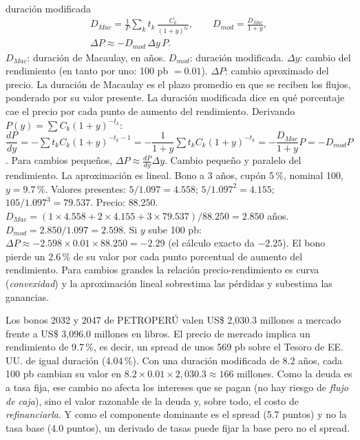 \begin{ficha}{duración modificada}
\begin{gather*} D_{Mac}=\frac{1}{P}\sum_{k}t_k\,\frac{C_k}{(1+y)^{t_k}},\qquad D_{mod}=\frac{D_{Mac}}{1+y},\\ \Delta P\approx-D_{mod}\,\Delta y\,P. \end{gather*}
 $D_{Mac}$: duración de Macaulay, en años. $D_{mod}$: duración modificada. $\Delta y$: cambio del rendimiento (en tanto por uno: 100 pb $=0.01$). $\Delta P$: cambio aproximado del precio.
 La duración de Macaulay es el plazo promedio en que se reciben los flujos, ponderado por su valor presente. La duración modificada dice en qué porcentaje cae el precio por cada punto de aumento del rendimiento.
 Derivando $P(y)=\sum C_k(1+y)^{-t_k}$: $\dfrac{dP}{dy}=-\sum t_kC_k(1+y)^{-t_k-1}=-\dfrac{1}{1+y}\sum t_kC_k(1+y)^{-t_k}=-\dfrac{D_{Mac}}{1+y}P=-D_{mod}P$. Para cambios pequeños, $\Delta P\approx\frac{dP}{dy}\Delta y$.
 Cambio pequeño y paralelo del rendimiento. La aproximación es lineal.
 Bono a 3 años, cupón 5\,\%, nominal 100, $y=9.7\,\%$. Valores presentes: $5/1.097=4.558$; $5/1.097^2=4.155$; $105/1.097^3=79.537$. Precio: $88.250$. $D_{Mac}=(1\times4.558+2\times4.155+3\times79.537)/88.250=2.850$ años. $D_{mod}=2.850/1.097=2.598$. Si $y$ sube 100 pb: $\Delta P\approx-2.598\times0.01\times88.250=-2.29$ (el cálculo exacto da $-2.25$).
 El bono pierde un 2.6\,\% de su valor por cada punto porcentual de aumento del rendimiento.
 Para cambios grandes la relación precio-rendimiento es curva (\emph{convexidad}) y la aproximación lineal sobrestima las pérdidas y subestima las ganancias.
\end{ficha}


\begin{informe}
Los bonos 2032 y 2047 de PETROPERÚ valen US\$ 2,030.3 millones a mercado frente a US\$ 3,096.0 millones en libros. El precio de mercado implica un rendimiento de 9.7\,\%, es decir, un spread de unos 569 pb sobre el Tesoro de EE.\,UU. de igual duración (4.04\,\%). Con una duración modificada de 8.2 años, cada 100 pb cambian su valor en $8.2\times0.01\times2{,}030.3\approx166$ millones. Como la deuda es a tasa fija, ese cambio no afecta los intereses que se pagan (no hay riesgo de \emph{flujo de caja}), sino el valor razonable de la deuda y, sobre todo, el costo de \emph{refinanciarla}. Y como el componente dominante es el spread (5.7 puntos) y no la tasa base (4.0 puntos), un derivado de tasas puede fijar la base pero no el spread.
\end{informe}


